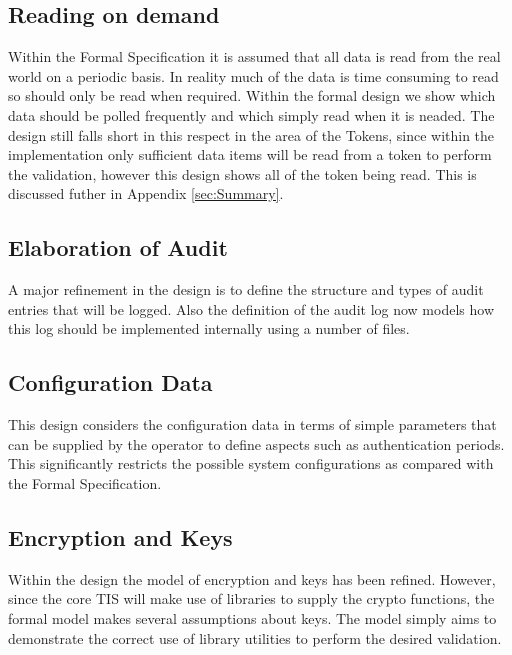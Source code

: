 \subsection{Reading on demand}
\label{sec:DemandReading}
Within the Formal Specification it is assumed that all data is read
from the real world on a periodic basis. In reality much of the data
is time consuming to read so should only be read when required. Within
the formal design we show which data should be polled frequently and
which simply read when it is neaded. The design still falls short in
this respect in the area of the Tokens, since within the
implementation  only sufficient data items will be read from a token to perform
the validation, however this design shows all of the token being read.
This is discussed futher in Appendix \ref{sec:Summary}. 

\subsection{Elaboration of Audit}
A major refinement in the design is to define the structure and types
of audit entries that will be logged. Also the definition of the audit
log now models how this log should be implemented internally using a
number of files.

\subsection{Configuration Data}
This design considers the configuration data in terms of simple
parameters that can be supplied by the operator to define aspects such
as authentication periods. This significantly restricts the possible
system configurations as compared with the Formal Specification.


\subsection{Encryption and Keys}
Within the design the model of encryption and keys has been
refined. However, since the core TIS will make use of libraries to
supply the crypto functions, the formal model makes several
assumptions about keys. The model simply aims to demonstrate the
correct use of library utilities to perform the desired validation.


